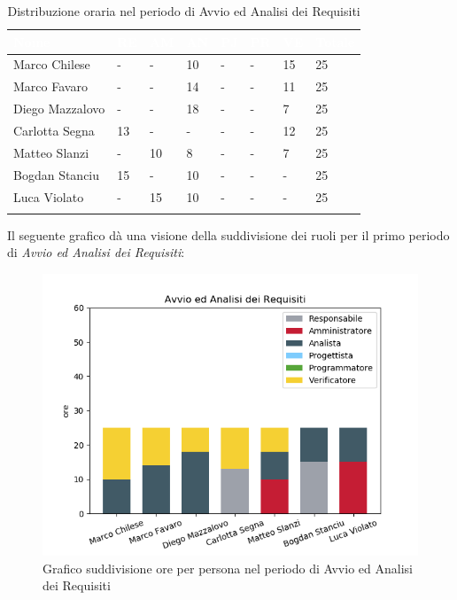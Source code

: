 \begin{longtable}{|C{.30\textwidth}|C{.06\textwidth}|C{.06\textwidth}|C{.06\textwidth} | C{.06\textwidth}| C{.06\textwidth} | C{.06\textwidth} | C{.10\textwidth} |}
\hline
{}	\textbf{\textcolor{white}{Nome}} & \textbf{\textcolor{white}{RE}} & \textbf{\textcolor{white}{AM}} & \textbf{\textcolor{white}{AN}} & \textbf{\textcolor{white}{PJ}} & \textbf{\textcolor{white}{PR}} & \textbf{\textcolor{white}{VE}} & \textbf{\textcolor{white}{Totale}}\\
\hline 
Marco Chilese & - & - & 10 & - & - & 15 & 25 \\
\hline
{}Marco Favaro & - & - & 14 & - & - & 11 & 25 \\
\hline
Diego Mazzalovo & - & - & 18 & - & - & 7 & 25 \\
\hline
{}Carlotta Segna & 13 & - & - & - & - & 12 & 25 \\
\hline
Matteo Slanzi & - & 10 & 8 & - & - & 7 & 25 \\
\hline
{}Bogdan Stanciu & 15 & - & 10 & - & - & - & 25\\
\hline
Luca Violato & - & 15 & 10 & - & - & - & 25 \\
\hline


\caption{Distribuzione oraria nel periodo di Avvio ed Analisi dei Requisiti}
\label{tab:dist oraria aar}
\end{longtable}
Il seguente grafico dà una visione della suddivisione dei ruoli per il primo periodo di \textit{Avvio ed Analisi dei Requisiti}:
\begin{figure}[H]
	\centering
  		\includegraphics[width=0.8\linewidth]{./images/fig_aar.png}
  		\caption{Grafico suddivisione ore per persona nel periodo di Avvio ed Analisi dei Requisiti}
  		\label{fig:grafico suddivione ruoli aar}
\end{figure}



